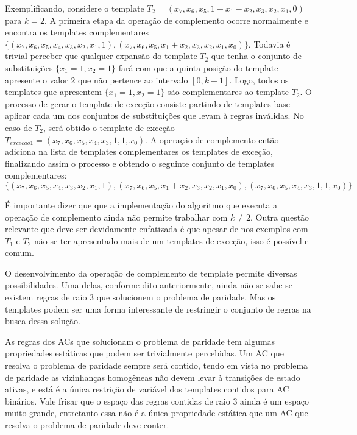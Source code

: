 \documentclass[12pt,a4paper]{article}
\begin{document}
	Exemplificando, considere o template $T_2 = (x_7, x_6, x_5, 1 - x_1 - x_2, x_3, x_2, x_1, 0)$ para $k=2$. A primeira etapa da operação de complemento ocorre normalmente e encontra os templates complementares $\{(x_7, x_6, x_5, x_4, x_3, x_2, x_1, 1),(x_7, x_6, x_5, x_1 + x_2, x_3, x_2, x_1, x_0)\}$. Todavia é trivial perceber que qualquer expansão do template $T_2$ que tenha o conjunto de substituições $\{x_1 = 1, x_2 = 1\}$ fará com que a quinta posição do template apresente o valor $2$ que não pertence ao intervalo $[0,k-1]$. Logo, todos os templates que apresentem $\{x_1 = 1, x_2 = 1\}$ são complementares ao template $T_2$. O processo de gerar o template de exceção consiste partindo de templates base aplicar cada um dos conjuntos de substituições que levam à regras inválidas. No caso de $T_2$, será obtido o template de exceção $T_{excecao 1} = (x_7, x_6, x_5, x_4, x_3, 1, 1, x_0)$. A operação de complemento então adiciona na lista de templates complementares os templates de exceção, finalizando assim o processo e obtendo o seguinte conjunto de templates complementares:
	\begin{equation}
	\{(x_7, x_6, x_5, x_4, x_3, x_2, x_1, 1),(x_7, x_6, x_5, x_1 + x_2, x_3, x_2, x_1, x_0),(x_7, x_6, x_5, x_4, x_3, 1, 1, x_0)\}
	\label{eq:complementionSet}
	\end{equation}

	É importante dizer que que a implementação do algoritmo que executa a operação de complemento ainda não permite trabalhar com $k\neq 2$. Outra questão relevante que deve ser devidamente enfatizada é que apesar de nos exemplos com $T_1$ e $T_2$ não se ter apresentado mais de um templates de exceção, isso é possível e comum.

	O desenvolvimento da operação de complemento de template permite diversas possibilidades. Uma delas, conforme dito anteriormente, ainda não se sabe se existem regras de raio 3 que solucionem o problema de paridade. Mas os templates podem ser uma forma interessante de restringir o conjunto de regras na busca dessa solução.

	As regras dos ACs que solucionam o problema de paridade tem algumas propriedades estáticas que podem ser trivialmente percebidas. Um AC que resolva o problema de paridade sempre será contido, tendo em vista no problema de paridade as vizinhanças homogêneas não devem levar à transições de estado ativas, e está é a única restrição de variável dos templates contidos para AC binários. Vale frisar que o espaço das regras contidas de raio 3 ainda é um espaço muito grande, entretanto essa não é a única propriedade estática que um AC que resolva o problema de paridade deve conter.
\end{document}
